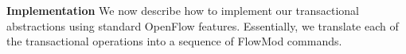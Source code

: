\documentclass[conference]{sigcomm-alternate}
\newcommand{\compare}{compare\xspace}
\newcommand{\liron}[1]{\textit{\textcolor{mygreen}{[liron]: #1}}} %
\newcommand{\petr}[1]{\textit{\textcolor{blue}{[petr]: #1}}} %
\begin{document}

\noindent\textbf{Implementation}\label{sec:t-impl}
%
We now describe how to implement our transactional
abstractions using standard OpenFlow features.
Essentially, we translate each of the transactional operations into a
sequence of FlowMod commands.
\end{document}
